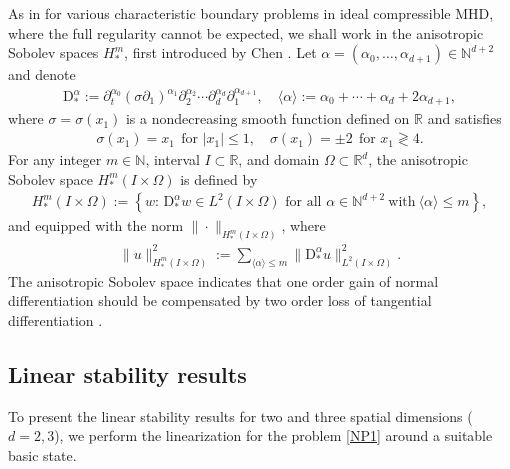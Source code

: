 \documentclass[twoside,11pt]{article}
\numberwithin{equation}{section}
\def\p{\partial}
\begin{document}
As in \cite{
	CW08MR2372810, ST13MR3148595,
	LZ23MR4632835,
	T09ARMAMR2481071,YM91MR1092572,TW21MR4201624,TW22aMR4444136,TW22cMR4506578,MSTTY24MR4754746,ST14MR3151094,STW23MR4654316,MSTY23MR4586863}  for various characteristic boundary problems in ideal compressible MHD, where the full regularity cannot be expected,
we shall work in the anisotropic Sobolev spaces $H_*^m$, first introduced by {\sc Chen} \cite{C07MR2289911}.
Let $\alpha=(\alpha_0,\ldots,\alpha_{d+1})\in\mathbb{N}^{d+2}$ and denote
\begin{align} \label{D*}
	\mathrm{D}_*^{\alpha}:=
	\p_t^{\alpha_0} (\sigma \p_1)^{\alpha_1}\p_2^{\alpha_2} \cdots\p_d^{\alpha_d}  \p_1^{\alpha_{d+1}},
	\quad
	\langle \alpha \rangle :=\alpha_0+\cdots+\alpha_d +2\alpha_{d+1},
\end{align}
where $\sigma=\sigma(x_1)$ is a nondecreasing smooth function defined on $\mathbb{R}$ and satisfies
\begin{align} \label{sigma:def}
	\sigma(x_1)=x_1\ \ \textrm{for } |x_1|\leq 1,\quad
	\sigma(x_1)=\pm 2  \ \ \textrm{for }  x_1\gtrless 4.
\end{align}
For any integer $m\in\mathbb{N}$, interval $I\subset \mathbb{R}$, and domain $\Omega\subset \mathbb{R}^{d}$, %
the anisotropic Sobolev space $H_*^{m}(I\times \Omega)$ is defined by
\begin{align} \label{H*m:def}
	H_*^m(I\times\Omega):=
	\left\{ w:\, \mathrm{D}_*^{\alpha} w\in L^2(I\times\Omega) \textrm{ for all } \alpha\in \mathbb{N}^{d+2}\
	\textrm{with}\  \langle \alpha \rangle\leq m  \right\},
\end{align}
and equipped with the norm ${\|}\cdot{\|}_{H^m_*(I\times \Omega)}$,
where
\begin{align}
	{\|}u{\|}_{H^m_*(I\times \Omega)}^2 :=
	\sum_{\langle \alpha\rangle\leq m} \|\mathrm{D}_*^{\alpha} u\|_{L^2(I \times\Omega)}^2.	
	\label{H*m:norm}
\end{align}
{The anisotropic Sobolev space indicates that one order gain of normal differentiation should be compensated by two order loss of tangential differentiation \cite{C07MR2289911}.}

	\subsection{Linear stability results}
	To present the linear stability results for two and three spatial dimensions ($d=2,3$),
we perform the linearization for the problem \eqref{NP1} around a suitable basic state.
\end{document}
